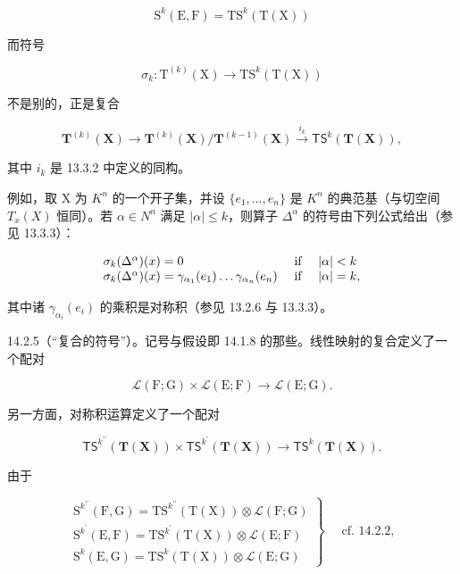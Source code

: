 \[
\mathrm{S} ^ {k} (\mathrm{E}, \mathrm{F}) = \mathrm{TS} ^ {k} (\mathrm{T} (\mathrm{X}))
\]

而符号

\[
\sigma_ {k} \colon \mathrm{T} ^ {(k)} (\mathrm{X}) \rightarrow \mathrm{TS} ^ {k} (\mathrm{T} (\mathrm{X}))
\]

不是别的，正是复合

\[
\mathbf {T} ^ {(k)} (\mathbf {X}) \rightarrow \mathbf {T} ^ {(k)} (\mathbf {X}) / \mathbf {T} ^ {(k - 1)} (\mathbf {X}) \xrightarrow {i _ {k}} \mathsf {T S} ^ {k} (\mathbf {T} (\mathbf {X})),
\]

其中 \(i_{k}\) 是 13.3.2 中定义的同构。

例如，取 X 为 \(K^{n}\) 的一个开子集，并设 \(\{e_{1},\ldots,e_{n}\}\) 是 \(K^{n}\) 的典范基（与切空间 \(T_{x}(X)\) 恒同）。若 \(\alpha\in N^{n}\) 满足 \(|\alpha|\leqslant k\)，则算子 \(\Delta^{\alpha}\) 的符号由下列公式给出（参见 13.3.3）：

\[
\begin{array}{l l} \sigma_ {k} (\Delta^ {\alpha}) (x) = 0 & \text { if } \quad | \alpha | <   k \\ \sigma_ {k} (\Delta^ {\alpha}) (x) = \gamma_ {\alpha_ {1}} (e _ {1}) \ldots \gamma_ {\alpha_ {n}} (e _ {n}) & \text { if } \quad | \alpha | = k, \end{array}
\]

其中诸 \(\gamma_{\alpha_i}(e_i)\) 的乘积是对称积（参见 13.2.6 与 13.3.3）。

14.2.5（“复合的符号”）。记号与假设即 14.1.8 的那些。线性映射的复合定义了一个配对

\[
\mathcal {L} (\mathrm{F}; \mathrm{G}) \times \mathcal {L} (\mathrm{E}; \mathrm{F}) \rightarrow \mathcal {L} (\mathrm{E}; \mathrm{G}).
\]

另一方面，对称积运算定义了一个配对

\[
\mathsf {T S} ^ {k ^ {\prime \prime}} (\mathbf {T} (\mathbf {X})) \times \mathsf {T S} ^ {k ^ {\prime}} (\mathbf {T} (\mathbf {X})) \rightarrow \mathsf {T S} ^ {k} (\mathbf {T} (\mathbf {X})).
\]

由于

\[
\left. \begin{array}{l} \mathrm{S} ^ {k ^ {\prime \prime}} (\mathrm{F}, \mathrm{G}) = \mathrm{TS} ^ {k ^ {\prime \prime}} (\mathrm{T} (\mathrm{X})) \otimes \mathscr {L} (\mathrm{F}; \mathrm{G}) \\ \mathrm{S} ^ {k ^ {\prime}} (\mathrm{E}, \mathrm{F}) = \mathrm{TS} ^ {k ^ {\prime}} (\mathrm{T} (\mathrm{X})) \otimes \mathscr {L} (\mathrm{E}; \mathrm{F}) \\ \mathrm{S} ^ {k} (\mathrm{E}, \mathrm{G}) = \mathrm{TS} ^ {k} (\mathrm{T} (\mathrm{X})) \otimes \mathscr {L} (\mathrm{E}; \mathrm{G}) \end{array} \right\} \quad \text { cf. } 1 4. 2. 2,
\]

